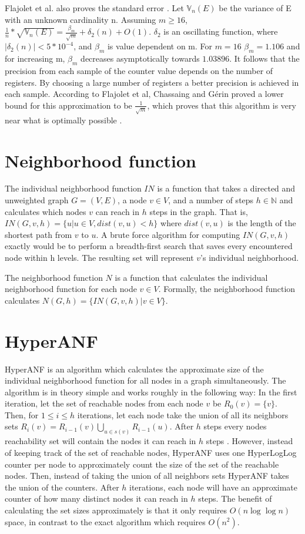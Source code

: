 Flajolet et al. also proves the standard error \cite{hyperloglog}. Let $\mathbb{V}_n(E)$ be the variance of E with an unknown cardinality n. Assuming $m \geq 16$,  $\frac{1}{n}*\sqrt{\mathbb{V}_n(E)} = \frac{\beta_m}{\sqrt{m}}  + \delta_2(n) + O(1)$. $\delta_2$ is an oscillating function, where $|\delta_2(n)| < 5*10^{-4}$, and $\beta_m$ is value dependent on m. For $m = 16$ $\beta_m = 1.106$ and for increasing m, $\beta_m$ decreases asymptotically towards $1.03896$. It follows that the precision from each sample of the counter value depends on the number of registers. By choosing a large number of registers a better precision is achieved in each sample. According to Flajolet et al, Chassaing and Gérin proved a lower bound for this approximation to be $\frac{1}{\sqrt{m}}$, which proves that this algorithm is very near what is optimally possible \cite{nearopt}.

\section{Neighborhood function}
The individual neighborhood function $IN$ is a function that takes a directed and unweighted graph $G = (V,E)$, a node $v \in V$, and a number of steps $h \in \mathbb{N}$ and calculates which nodes $v$ can reach in $h$ steps in the graph. That is, $IN(G,v,h) = \{u | u \in V, dist(v,u) < h\}$ where $dist(v,u)$ is the length of the shortest path from $v$ to $u$. A brute force algorithm for computing $IN(G,v,h)$ exactly would be to perform a breadth-first search that saves every encountered node within h levels. The resulting set will represent $v$'s individual neighborhood.

The neighborhood function $N$ is a function that calculates the individual neighborhood function for each node $v \in V$. Formally, the neighborhood function calculates $N(G,h) = \{ IN(G,v,h) | v \in V \}$.


\section{HyperANF}
HyperANF is an algorithm which calculates the approximate size of the individual neighborhood function for all nodes in a graph simultaneously. The algorithm is in theory simple and works roughly in the following way: In the first iteration, let the set of reachable nodes from each node $v$ be $R_0(v) = \{v\}$. Then, for $1 \leq i \leq h$ iterations, let each node take the union of all its neighbors sets $R_i(v) = R_{i-1}(v) \bigcup\limits_{u \in s(v)} R_{i-1}(u) $. After $h$ steps every nodes reachability set will contain the nodes it can reach in $h$ steps \cite{hyperball}. However, instead of keeping track of the set of reachable nodes, HyperANF uses one HyperLogLog counter per node to approximately count the size of the set of the reachable nodes. Then, instead of taking the union of all neighbors sets HyperANF takes the union of the counters. After $h$ iterations, each node will have an approximate counter of how many distinct nodes it can reach in $h$ steps. The benefit of calculating the set sizes approximately is that it only requires $O(n\log\log n)$ space, in contrast to the exact algorithm which requires $O(n^2)$.


